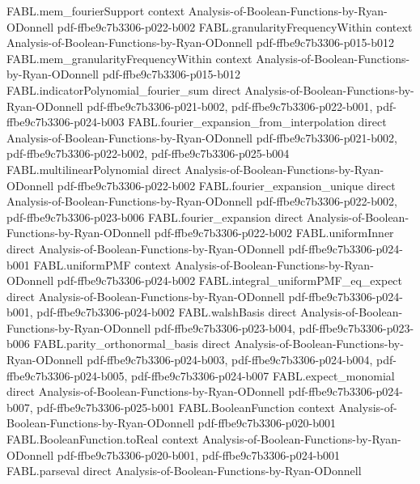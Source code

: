 \begin{theorem}
\proofstep
  {FABL.mem_fourierSupport}
  {context}
  {Analysis-of-Boolean-Functions-by-Ryan-ODonnell}
  {pdf-ffbe9c7b3306-p022-b002}
\proofstep
  {FABL.granularityFrequencyWithin}
  {context}
  {Analysis-of-Boolean-Functions-by-Ryan-ODonnell}
  {pdf-ffbe9c7b3306-p015-b012}
\proofstep
  {FABL.mem_granularityFrequencyWithin}
  {context}
  {Analysis-of-Boolean-Functions-by-Ryan-ODonnell}
  {pdf-ffbe9c7b3306-p015-b012}
\proofstep
  {FABL.indicatorPolynomial_fourier_sum}
  {direct}
  {Analysis-of-Boolean-Functions-by-Ryan-ODonnell}
  {pdf-ffbe9c7b3306-p021-b002,
    pdf-ffbe9c7b3306-p022-b001,
    pdf-ffbe9c7b3306-p024-b003}
\proofstep
  {FABL.fourier_expansion_from_interpolation}
  {direct}
  {Analysis-of-Boolean-Functions-by-Ryan-ODonnell}
  {pdf-ffbe9c7b3306-p021-b002,
    pdf-ffbe9c7b3306-p022-b002,
    pdf-ffbe9c7b3306-p025-b004}
\proofstep
  {FABL.multilinearPolynomial}
  {direct}
  {Analysis-of-Boolean-Functions-by-Ryan-ODonnell}
  {pdf-ffbe9c7b3306-p022-b002}
\proofstep
  {FABL.fourier_expansion_unique}
  {direct}
  {Analysis-of-Boolean-Functions-by-Ryan-ODonnell}
  {pdf-ffbe9c7b3306-p022-b002,
    pdf-ffbe9c7b3306-p023-b006}
\proofstep
  {FABL.fourier_expansion}
  {direct}
  {Analysis-of-Boolean-Functions-by-Ryan-ODonnell}
  {pdf-ffbe9c7b3306-p022-b002}
\proofstep
  {FABL.uniformInner}
  {direct}
  {Analysis-of-Boolean-Functions-by-Ryan-ODonnell}
  {pdf-ffbe9c7b3306-p024-b001}
\proofstep
  {FABL.uniformPMF}
  {context}
  {Analysis-of-Boolean-Functions-by-Ryan-ODonnell}
  {pdf-ffbe9c7b3306-p024-b002}
\proofstep
  {FABL.integral_uniformPMF_eq_expect}
  {direct}
  {Analysis-of-Boolean-Functions-by-Ryan-ODonnell}
  {pdf-ffbe9c7b3306-p024-b001,
    pdf-ffbe9c7b3306-p024-b002}
\proofstep
  {FABL.walshBasis}
  {direct}
  {Analysis-of-Boolean-Functions-by-Ryan-ODonnell}
  {pdf-ffbe9c7b3306-p023-b004,
    pdf-ffbe9c7b3306-p023-b006}
\proofstep
  {FABL.parity_orthonormal_basis}
  {direct}
  {Analysis-of-Boolean-Functions-by-Ryan-ODonnell}
  {pdf-ffbe9c7b3306-p024-b003,
    pdf-ffbe9c7b3306-p024-b004,
    pdf-ffbe9c7b3306-p024-b005,
    pdf-ffbe9c7b3306-p024-b007}
\proofstep
  {FABL.expect_monomial}
  {direct}
  {Analysis-of-Boolean-Functions-by-Ryan-ODonnell}
  {pdf-ffbe9c7b3306-p024-b007,
    pdf-ffbe9c7b3306-p025-b001}
\proofstep
  {FABL.BooleanFunction}
  {context}
  {Analysis-of-Boolean-Functions-by-Ryan-ODonnell}
  {pdf-ffbe9c7b3306-p020-b001}
\proofstep
  {FABL.BooleanFunction.toReal}
  {context}
  {Analysis-of-Boolean-Functions-by-Ryan-ODonnell}
  {pdf-ffbe9c7b3306-p020-b001,
    pdf-ffbe9c7b3306-p024-b001}
\proofstep
  {FABL.parseval}
  {direct}
  {Analysis-of-Boolean-Functions-by-Ryan-ODonnell}

\end{theorem}
